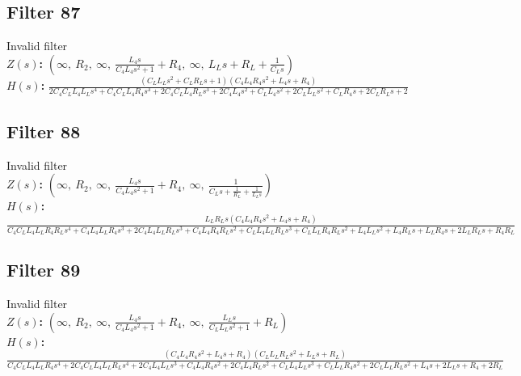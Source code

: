 \documentclass{article}
\begin{document}
\subsection*{Filter 87}
Invalid filter \\ 
\textbf{$Z(s)$:} $\left( \infty, \  R_{2}, \  \infty, \  \frac{L_{4} s}{C_{4} L_{4} s^{2} + 1} + R_{4}, \  \infty, \  L_{L} s + R_{L} + \frac{1}{C_{L} s}\right)$ \\ 
\textbf{$H(s)$:} $\frac{\left(C_{L} L_{L} s^{2} + C_{L} R_{L} s + 1\right) \left(C_{4} L_{4} R_{4} s^{2} + L_{4} s + R_{4}\right)}{2 C_{4} C_{L} L_{4} L_{L} s^{4} + C_{4} C_{L} L_{4} R_{4} s^{3} + 2 C_{4} C_{L} L_{4} R_{L} s^{3} + 2 C_{4} L_{4} s^{2} + C_{L} L_{4} s^{2} + 2 C_{L} L_{L} s^{2} + C_{L} R_{4} s + 2 C_{L} R_{L} s + 2}$ \\ 
\subsection*{Filter 88}
Invalid filter \\ 
\textbf{$Z(s)$:} $\left( \infty, \  R_{2}, \  \infty, \  \frac{L_{4} s}{C_{4} L_{4} s^{2} + 1} + R_{4}, \  \infty, \  \frac{1}{C_{L} s + \frac{1}{R_{L}} + \frac{1}{L_{L} s}}\right)$ \\ 
\textbf{$H(s)$:} $\frac{L_{L} R_{L} s \left(C_{4} L_{4} R_{4} s^{2} + L_{4} s + R_{4}\right)}{C_{4} C_{L} L_{4} L_{L} R_{4} R_{L} s^{4} + C_{4} L_{4} L_{L} R_{4} s^{3} + 2 C_{4} L_{4} L_{L} R_{L} s^{3} + C_{4} L_{4} R_{4} R_{L} s^{2} + C_{L} L_{4} L_{L} R_{L} s^{3} + C_{L} L_{L} R_{4} R_{L} s^{2} + L_{4} L_{L} s^{2} + L_{4} R_{L} s + L_{L} R_{4} s + 2 L_{L} R_{L} s + R_{4} R_{L}}$ \\ 
\subsection*{Filter 89}
Invalid filter \\ 
\textbf{$Z(s)$:} $\left( \infty, \  R_{2}, \  \infty, \  \frac{L_{4} s}{C_{4} L_{4} s^{2} + 1} + R_{4}, \  \infty, \  \frac{L_{L} s}{C_{L} L_{L} s^{2} + 1} + R_{L}\right)$ \\ 
\textbf{$H(s)$:} $\frac{\left(C_{4} L_{4} R_{4} s^{2} + L_{4} s + R_{4}\right) \left(C_{L} L_{L} R_{L} s^{2} + L_{L} s + R_{L}\right)}{C_{4} C_{L} L_{4} L_{L} R_{4} s^{4} + 2 C_{4} C_{L} L_{4} L_{L} R_{L} s^{4} + 2 C_{4} L_{4} L_{L} s^{3} + C_{4} L_{4} R_{4} s^{2} + 2 C_{4} L_{4} R_{L} s^{2} + C_{L} L_{4} L_{L} s^{3} + C_{L} L_{L} R_{4} s^{2} + 2 C_{L} L_{L} R_{L} s^{2} + L_{4} s + 2 L_{L} s + R_{4} + 2 R_{L}}$ \\ 
\end{document}
